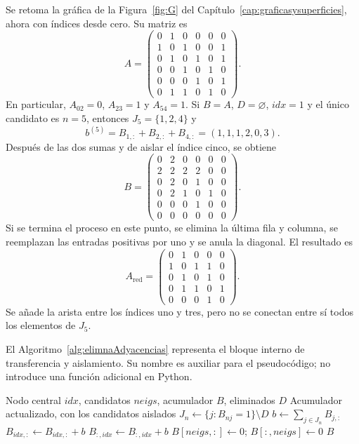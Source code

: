 \begin{example}
Se retoma la gráfica de la Figura~\ref{fig:G} del Capítulo~\ref{cap:graficasysuperficies}, ahora con índices desde cero. Su matriz es
\[
A=\begin{pmatrix}
0&1&0&0&0&0\\
1&0&1&0&0&1\\
0&1&0&1&0&1\\
0&0&1&0&1&0\\
0&0&0&1&0&1\\
0&1&1&0&1&0
\end{pmatrix}.
\]
En particular, $A_{02}=0$, $A_{23}=1$ y $A_{54}=1$. Si $B=A$, $D=\varnothing$, $idx=1$ y el único candidato es $n=5$, entonces $J_5=\{1,2,4\}$ y
\[
b^{(5)}=B_{1,:}+B_{2,:}+B_{4,:}=(1,1,1,2,0,3).
\]
Después de las dos sumas y de aislar el índice cinco, se obtiene
\[
B=\begin{pmatrix}
0&2&0&0&0&0\\
2&2&2&2&0&0\\
0&2&0&1&0&0\\
0&2&1&0&1&0\\
0&0&0&1&0&0\\
0&0&0&0&0&0
\end{pmatrix}.
\]
Si se termina el proceso en este punto, se elimina la última fila y columna, se reemplazan las entradas positivas por uno y se anula la diagonal. El resultado es
\[
A_{\mathrm{red}}=\begin{pmatrix}
0&1&0&0&0\\
1&0&1&1&0\\
0&1&0&1&0\\
0&1&1&0&1\\
0&0&0&1&0
\end{pmatrix}.
\]
Se añade la arista entre los índices uno y tres, pero no se conectan entre sí todos los elementos de $J_5$.
\end{example}

El Algoritmo~\ref{alg:elimnaAdyacencias} representa el bloque interno de transferencia y aislamiento. Su nombre es auxiliar para el pseudocódigo; no introduce una función adicional en Python.
\begin{algorithm}[H]
\caption{Transferencia al nodo central y aislamiento de un lote}
\label{alg:elimnaAdyacencias}
\begin{algorithmic}[1]
\Require Nodo central $idx$, candidatos $neigs$, acumulador $B$, eliminados $D$
\Ensure Acumulador actualizado, con los candidatos aislados
        \State $J_n\gets\{j:B_{nj}=1\}\setminus D$
            \State $b\gets\sum_{j\in J_n}B_{j,:}$
            \State $B_{idx,:}\gets B_{idx,:}+b$
            \State $B_{:,idx}\gets B_{:,idx}+b$
        \EndIf
    \EndFor
    \State $B[neigs,:]\gets0$; $B[:,neigs]\gets0$
    \State \Return $B$
\EndFunction
\end{algorithmic}
\end{algorithm}

